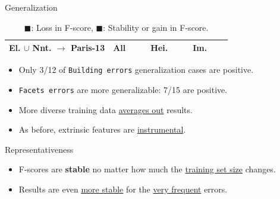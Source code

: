 \documentclass[10pt, export]{beamer}
\begin{document}
\begin{frame}{Generalization}
{\begin{table}
\begin{center}
\begin{tabular}{| x{1.5cm}| x{.4cm} | x{.4cm} | x{.4cm} | x{.4cm} | x{.4cm} | x{.4cm} | x{.4cm} | x{.4cm} | x{.4cm} |}
                            \hline
                            El. $\cup$ Nnt. $\rightarrow$ Paris-13   &All & &  &Hei. & & &Im. &  &\\
                            \hline
                        \end{tabular}
                        \caption{\footnotesize \textcolor{IGNRed}{$\blacksquare$}: Loss in F-score, \textcolor{IGNGreen}{$\blacksquare$}: Stability or gain in F-score.}
                    \end{center}
                \end{table}
                \begin{itemize}[label=$\blacktriangleright$, font=\color{IGNGreen}]
                    \item<2-> \footnotesize Only 3/12 of \texttt{Building errors} generalization cases are \textcolor{IGNGreen}{positive}.
                    \item<3-> \footnotesize \texttt{Facets errors} are more generalizable: 7/15 are \textcolor{IGNGreen}{positive}.
                    \item<4-> \footnotesize More diverse training data \underline{averages out} results.
                    \item<5-> \footnotesize As before, extrinsic features are \underline{instrumental}.
                \end{itemize}
            }
        \end{frame}
        \begin{frame}{Representativeness}
            \begin{figure}
                
            \end{figure}
            \begin{itemize}[label=$\blacktriangleright$, font=\color{IGNGreen}]
                \item<2-> \footnotesize F-scores are \textbf{stable} no matter how much the \underline{training set size} changes.
                \item<3-> \footnotesize Results are even \underline{more stable} for the \underline{very frequent} errors.
            \end{itemize}
        \end{frame}
\end{document}
